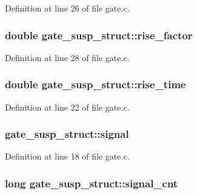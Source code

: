 Definition at line 26 of file gate.\+c.

\subsubsection[{\texorpdfstring{rise\+\_\+factor}{rise_factor}}]{\setlength{\rightskip}{0pt plus 5cm}double gate\+\_\+susp\+\_\+struct\+::rise\+\_\+factor}\hypertarget{structgate__susp__struct_af7ee75e5c345f59b7414578f5760102c}{}\label{structgate__susp__struct_af7ee75e5c345f59b7414578f5760102c}


Definition at line 28 of file gate.\+c.

\subsubsection[{\texorpdfstring{rise\+\_\+time}{rise_time}}]{\setlength{\rightskip}{0pt plus 5cm}double gate\+\_\+susp\+\_\+struct\+::rise\+\_\+time}\hypertarget{structgate__susp__struct_aa9e1c70d43bd2132c957bf4539b56e15}{}\label{structgate__susp__struct_aa9e1c70d43bd2132c957bf4539b56e15}


Definition at line 22 of file gate.\+c.

\subsubsection[{\texorpdfstring{signal}{signal}}]{ gate\+\_\+susp\+\_\+struct\+::signal}\hypertarget{structgate__susp__struct_a0e66646afc1fff07b6619f745c6ef3e7}{}\label{structgate__susp__struct_a0e66646afc1fff07b6619f745c6ef3e7}


Definition at line 18 of file gate.\+c.

\subsubsection[{\texorpdfstring{signal\+\_\+cnt}{signal_cnt}}]{\setlength{\rightskip}{0pt plus 5cm}long gate\+\_\+susp\+\_\+struct\+::signal\+\_\+cnt}\hypertarget{structgate__susp__struct_a1a56be66b6c7439f80d39309852551a4}{}\label{structgate__susp__struct_a1a56be66b6c7439f80d39309852551a4}


